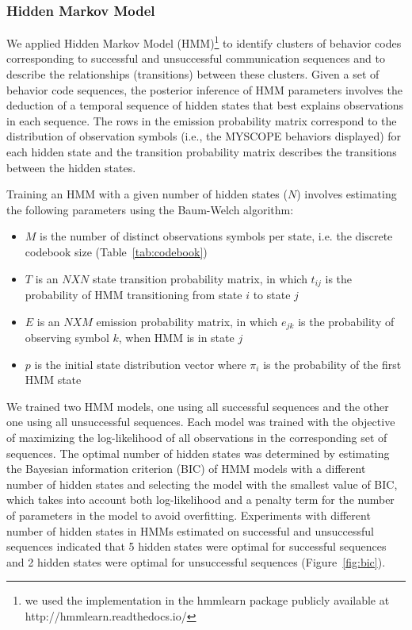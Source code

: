 \subsubsection{Hidden Markov Model}
\label{subsubsec:hiddenMarkovModel}
We applied Hidden Markov Model (HMM)\footnote{we used the implementation in the hmmlearn package publicly available at http://hmmlearn.readthedocs.io/} to identify clusters of behavior codes corresponding to successful and unsuccessful communication sequences and to describe the relationships (transitions) between these clusters. Given a set of behavior code sequences, the posterior inference of HMM parameters involves the deduction of a temporal sequence of hidden states that best explains observations in each sequence. The rows in the emission probability matrix correspond to the distribution of observation symbols (i.e., the MYSCOPE behaviors displayed) for each hidden state and the transition probability matrix describes the transitions between the hidden states.

Training an HMM with a given number of hidden states ($N$) involves estimating the following parameters using the Baum-Welch algorithm:

\begin{itemize}
\item $M$ is the number of distinct observations symbols per state, i.e. the discrete codebook size (Table~\ref{tab:codebook})
\item $T$ is an $NXN$ state transition probability matrix, in which $t_{ij}$ is the probability of HMM transitioning from state $i$ to state $j$  
\item $E$ is an $NXM$ emission probability matrix, in which $e_{jk}$ is the probability of observing symbol $k$, when HMM is in state $j$ 
\item $p$ is the initial state distribution vector where $\pi_i$ is the probability of the first HMM state
\end{itemize}

We trained two HMM models, one using all successful sequences and the other one using all unsuccessful sequences. Each model was trained with the objective of maximizing the log-likelihood of all observations in the corresponding set of sequences. The optimal number of hidden states was determined by estimating the Bayesian information criterion (BIC) of HMM models with a different number of hidden states and selecting the model with the smallest value of BIC, which takes into account both log-likelihood and a penalty term for the number of parameters in the model to avoid overfitting. Experiments with different number of hidden states in HMMs estimated on successful and unsuccessful sequences indicated that 5 hidden states were optimal for successful sequences and 2 hidden states were optimal for unsuccessful sequences (Figure~\ref{fig:bic}). 

